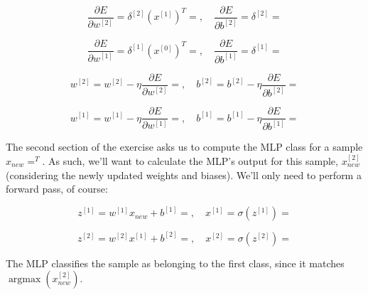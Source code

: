 \documentclass[12pt]{article}
\begin{document}
\begin{enumerate}[leftmargin=\labelsep]
  \begin{equation*}
    \frac{\partial E}{\partial w^{[2]}} = \delta^{[2]} (x^{[1]})^T = , \quad
    \frac{\partial E}{\partial b^{[2]}} = \delta^{[2]} = 
  \end{equation*}

  \begin{equation*}
    \frac{\partial E}{\partial w^{[1]}} = \delta^{[1]} (x^{[0]})^T = , \quad
    \frac{\partial E}{\partial b^{[1]}} = \delta^{[1]} = 
  \end{equation*}

  \begin{equation*}
    w^{[2]} = w^{[2]} - \eta \frac{\partial E}{\partial w^{[2]}} = , \quad
    b^{[2]} = b^{[2]} - \eta \frac{\partial E}{\partial b^{[2]}} = 
  \end{equation*}

  \begin{equation*}
    w^{[1]} = w^{[1]} - \eta \frac{\partial E}{\partial w^{[1]}} = , \quad
    b^{[1]} = b^{[1]} - \eta \frac{\partial E}{\partial b^{[1]}} = 
  \end{equation*}

  \pagebreak

  The second section of the exercise asks us to compute the MLP class for a sample
  $x_{new} = ^T$. As such, we'll want to calculate
  the MLP's output for this sample, $x^{[2]}_{new}$ (considering the newly updated
  weights and biases). We'll only need to perform a forward pass, of course:

  \begin{equation*}
    z^{[1]} = w^{[1]} x_{new} + b^{[1]} = , \quad
    x^{[1]} = \sigma(z^{[1]}) = 
  \end{equation*}

  \begin{equation*}
    z^{[2]} = w^{[2]} x^{[1]} + b^{[2]} = , \quad
    x^{[2]} = \sigma(z^{[2]}) = 
  \end{equation*}

  The MLP classifies the sample as belonging to the first class, since
  it matches $\operatorname{argmax}(x^{[2]}_{new})$.


\end{enumerate}
\end{document}
